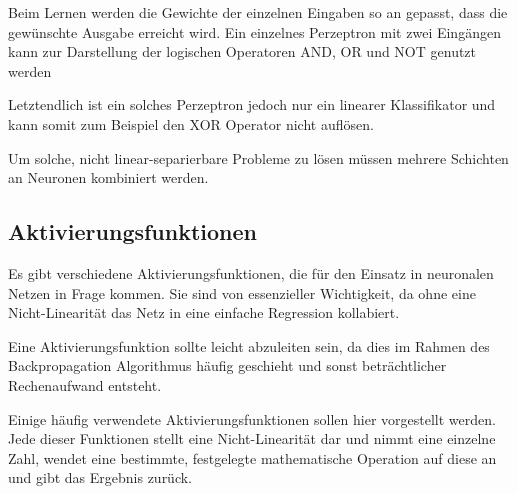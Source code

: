 Beim Lernen werden die Gewichte der einzelnen Eingaben so an gepasst, dass die gewünschte Ausgabe erreicht wird.
Ein einzelnes Perzeptron mit zwei Eingängen kann zur Darstellung der logischen Operatoren AND, OR und NOT genutzt werden

Letztendlich ist ein solches Perzeptron jedoch nur ein linearer Klassifikator und kann somit zum Beispiel den XOR Operator nicht auflösen.


Um solche, nicht linear-separierbare Probleme zu lösen müssen mehrere Schichten an Neuronen kombiniert werden.

\subsection{Aktivierungsfunktionen}
\label{activationfuncs}
Es gibt verschiedene Aktivierungsfunktionen, die für den Einsatz in neuronalen Netzen in Frage kommen.
Sie sind von essenzieller Wichtigkeit, da ohne eine Nicht-Linearität das Netz in eine einfache Regression kollabiert.

Eine Aktivierungsfunktion sollte leicht abzuleiten sein, 
da dies im Rahmen des Backpropagation Algorithmus häufig geschieht und sonst beträchtlicher Rechenaufwand entsteht.

Einige häufig verwendete Aktivierungsfunktionen sollen hier vorgestellt werden.
Jede dieser Funktionen stellt eine Nicht-Linearität dar und nimmt eine einzelne Zahl, wendet eine bestimmte, festgelegte mathematische 
Operation auf diese an und gibt das Ergebnis zurück.


